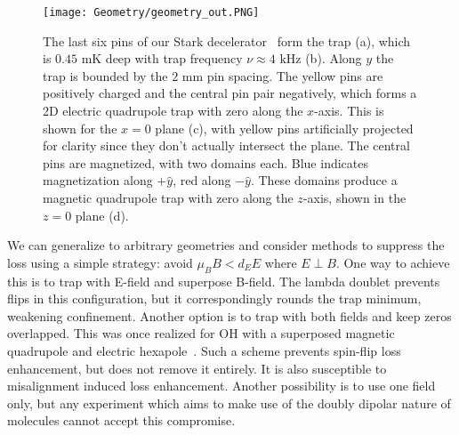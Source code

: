 \documentclass[%
 reprint,
 amsmath,amssymb,
 aps,
prl,
]{revtex4-1}
\newcommand{\epb}{{$E\!\perp\!B$}}
\begin{document}
\begin{figure}[tb]
\texttt{[image: Geometry/geometry\_out.PNG]}%
\caption{
The last six pins of our Stark decelerator~\cite{Sawyer2008} form the trap (a), which is $0.45\text{ mK}$ deep with trap frequency $\nu\approx4\text{ kHz}$ (b). Along $y$ the trap is bounded by the $2\text{ mm}$ pin spacing. The yellow pins are positively charged and the central pin pair negatively, which forms a 2D electric quadrupole trap with zero along the $x$-axis. This is shown for the $x=0$ plane (c), with yellow pins artificially projected for clarity since they don't actually intersect the plane. The central pins are magnetized, with two domains each. Blue indicates magnetization along $+\hat{y}$, red along $-\hat{y}$. These domains produce a magnetic quadrupole trap with zero along the $z$-axis, shown in the $z=0$ plane (d). %
\label{fig:CAD}}
\end{figure}

We can generalize to arbitrary geometries and consider methods to suppress the loss using a simple strategy: avoid $\mu_BB < d_EE$ where \epb. One way to achieve this is to trap with E-field and superpose B-field. The lambda doublet prevents flips in this configuration, but it correspondingly rounds the trap minimum, weakening confinement. Another option is to trap with both fields and keep zeros overlapped. This was once realized for OH with a superposed magnetic quadrupole and electric hexapole~\cite{Sawyer2007}. Such a scheme prevents spin-flip loss enhancement, but does not remove it entirely. It is also susceptible to misalignment induced loss enhancement. Another possibility is to use one field only, but any experiment which aims to make use of the doubly dipolar nature of molecules cannot accept this compromise. 
\end{document}
